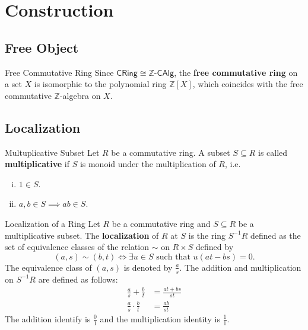 \section{Construction}
\subsection{Free Object}
\begin{definition}{Free Commutative Ring}{}
    Since $\mathsf{CRing}\cong \mathbb{Z}\text{-}\mathsf{CAlg}$, the \textbf{free commutative ring} on a set $X$ is isomorphic to the polynomial ring $\mathbb{Z}[X]$, which coincides with the free commutative $\mathbb{Z}$-algebra on $X$.
\end{definition}

\subsection{Localization}
\begin{definition}{Multuplicative Subset}{}
    Let $R$ be a commutative ring. A subset $S\subseteq R$ is called \textbf{multiplicative} if $S$ is monoid under the multiplication of $R$, i.e.
    \begin{enumerate}[(i)]
        \item $1\in S$.
        \item $a,b\in S\implies ab\in S$.
    \end{enumerate}
\end{definition}



\begin{definition}{Localization of a Ring}{}
    Let $R$ be a commutative ring and $S\subseteq R$ be a multiplicative subset. The \textbf{localization} of $R$ at $S$ is the ring $S^{-1}R$ defined as the set of equivalence classes of the relation $\sim$ on $R\times S$ defined by $$(a,s)\sim (b,t)\iff \exists u\in S\text{ such that }u(at-bs)=0.$$
    The equivalence class of $(a,s)$ is denoted by $\frac{a}{s}$. The addition and multiplication on $S^{-1}R$ are defined as follows:
    \begin{align*}
        \frac{a}{s}+\frac{b}{t}&=\frac{at+bs}{st}\\
        \frac{a}{s}\cdot\frac{b}{t}&=\frac{ab}{st}
    \end{align*}
    The addition identify is $\frac{0}{1}$ and the multiplication identity is $\frac{1}{1}$.
\end{definition}


